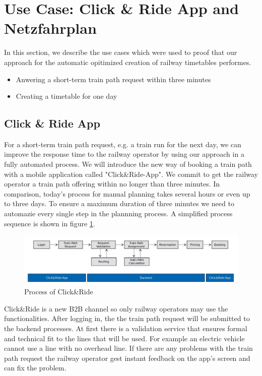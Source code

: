 \section{Use Case: Click \& Ride App and Netzfahrplan}
\label{chap:useCases}
In this section, we describe the use cases which were used to proof that our approach for the automatic opitimized creation of railway timetables performes. 

\begin{itemize}
	\item[1)] Anwering a short-term train path request within three minutes
	\item[2)] Creating a timetable for one day 
\end{itemize}

\subsection{Click \& Ride App}
\label{chap:CnR}
For a short-term train path request, e.g. a train run for the next day, we can improve the response time to the railway operator by using our approach in a fully automated process. We will introduce the new way of booking a train path with a mobile application called "Click\&Ride-App". We commit to get the railway operator a train path offering within no longer than three minutes. In comparison, today's process for manual planning takes several hours or even up to three days. To ensure a maximum duration of three minutes we need to automazie every single step in the plannning process. A simplified process sequence is shown in figure \ref{fig:process_sequence}. 
\begin{figure}[htb]
	\centering
	\includegraphics[width=\textwidth]{Bilder/process_sequence.jpg}
	\caption{Process of Click\&Ride}
	\label{fig:process_sequence}
\end{figure}

Click\&Ride is a new B2B channel so only railway operators may use the functionalities. After logging in, the the train path request will be submitted to the backend processes. At first there is a validation service that ensures formal and technical fit to the lines that will be used. For example an electric vehicle cannot use a line with no overhead line. If there are any problems with the train path request the railway operator gest instant feedback on the app's screen and can fix the problem.

